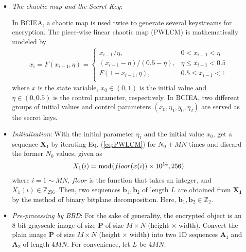 \documentclass[final,3p,times,twocolumn]{elsarticle}
\begin{document}
\begin{itemize}
	
	\item \emph{The chaotic map and the Secret Key}:
	
	In BCIEA, a chaotic map is used twice to generate several keystreams for encryption. The piece-wise linear chaotic map (PWLCM) is mathematically modeled by
	\begin{equation}
	\begin{aligned}
	x_i = F(x_{i-1},\eta)=	\begin{cases}
	x_{i-1}/ \eta,              & 0<x_{i-1}<\eta \\
	(x_{i-1}- \eta)/(0.5-\eta), & \eta \le x_{i-1}<0.5 \\
	F(1-x_{i-1},\eta),          & 0.5 \le x_{i-1}<1 \\
	\end{cases}
	\end{aligned}
	\label{eq:PWLCM}
	\end{equation}
	where $x$ is the state variable, $x_0 \in (0,1)$ is the initial value and $\eta \in (0,0.5)$ is the control parameter, respectively. In BCIEA, two different groups of  initial values and control parameters $(x_0,\eta_1,y_0,\eta_2)$ are served as the secret keys.
	
	\item \emph{Initialization}:
	With the initial parameter $\eta_1$ and the initial value $x_0$, get a sequence $\bm{X}_1$ by iterating Eq. (\ref{eq:PWLCM}) for $N_0+MN$ times and discard the former $N_0$ values, given as
			\begin{equation*}
			X_1(i) = \bmod(floor(x(i))\times 10^{14},256)\\
			\label{eq:PRNS}
			\end{equation*}
			where $i =1 \sim MN$, $floor$ is the function that takes an integer, and $X_1(i) \in \mathbb{Z}_{256}$. Then, two sequences $\bm{b}_1,\bm{b}_2$ of length $L$ are obtained from $\bm{X_1}$ by the method of binary bitplane decomposition. Here, $\bm{b}_1,\bm{b}_2 \in \mathbb{Z}_{2}$.
	
	\item \emph{Pre-processing by BBD}:
	For the sake of generality, the encrypted object is an 8-bit grayscale image of size $\bm{P}$ of size $M \times N$ (height $\times$ width). Convert the plain image $\bm{P}$ of size $M \times N$ (height $\times$ width) into two 1D sequences $\bm{A}_1$ and $\bm{A}_2$ of length $4MN$. For convenience, let $L$ be $4MN$.
	

\end{itemize}
\end{document}
